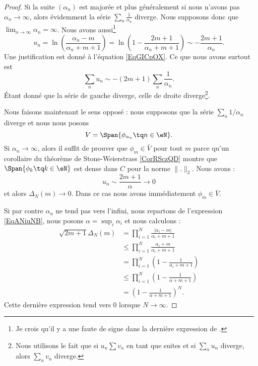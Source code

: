 \begin{proof}
    Si la suite \( (\alpha_n)\) est majorée et plus généralement si nous n'avons pas \( \alpha_n\to \infty\), alors évidemment la série \( \sum_n\frac{1}{ \alpha_n }\) diverge. Nous supposons donc que \( \lim_{n\to \infty} \alpha_n=\infty\). Nous avons aussi\footnote{Je crois qu'il y a une faute de signe dans la dernière expression de \cite{oYGash}.}
    \begin{equation}
        u_n=\ln\left( \frac{ \alpha_n-m }{ \alpha_n+m+1 } \right)=\ln\left( 1-\frac{ 2m+1 }{ \alpha_n+m+1 } \right)\sim-\frac{ 2m+1 }{ \alpha_n }.
    \end{equation}
    Une justification est donné à l'équation \eqref{EqGICpOX}. Ce que nous avons surtout est
    \begin{equation}
        \sum_n u_n\sim -(2m+1)\sum_n\frac{1}{ \alpha_n }.
    \end{equation}
    Étant donné que la série de gauche diverge, celle de droite diverge\footnote{Nous utilisons le fait que si \( u_n\sum v_n\) en tant que suites et si \( \sum_nu_n\) diverge, alors \( \sum_nv_n\) diverge.}.

    Nous faisons maintenant le sens opposé : nous supposons que la série \( \sum_n1/\alpha_n\) diverge et nous nous posons
    \begin{equation}
        V=\Span\{ \phi_{\alpha_n}\tq n\in \eN \}.
    \end{equation}
    Si \( \alpha_n\to \infty\), alors il suffit de prouver que \( \phi_m\in \bar V\) pour tout \( m\) parce qu'un corollaire du théorème de Stone-Weierstrass \ref{CorRSczQD} montre que \( \Span\{ \phi_k\tq k\in \eN \}\) est dense dans \( C\) pour la norme \( \| . \|_2\). Nous avons :
    \begin{equation}
        u_n\sim\frac{ 2m+1 }{ \alpha }\to 0
    \end{equation}
    et alors \( \Delta_N(m)\to 0\). Dans ce cas nous avons immédiatement \( \phi_m\in \bar V\).

    Si par contre \( \alpha_n\) ne tend pas vers l'infini, nous repartons de l'expression \eqref{EqANiuNB}, nous posons \( \alpha=\sup_i\alpha_i\) et nous calculons :
    \begin{subequations}
        \begin{align}
            \sqrt{2m+1}\Delta_N(m)&=\prod_{i=1}^N\frac{ | \alpha_i-m | }{ \alpha_i+m+1 }\\
            &\leq \prod_{i=1}^N\frac{ \alpha_i+m }{ \alpha_i+m+1 }\\
            &=\prod_{i=1}^N\left( 1-\frac{ 1 }{ \alpha_i+m+1 } \right)\\
            &\leq \prod_{i=1}^N\left( 1-\frac{1}{ \alpha+m+1 } \right)\\
            &=\left( 1-\frac{1}{ \alpha+m+1 } \right)^N.
        \end{align}
    \end{subequations}
    Cette dernière expression tend vers \( 0\) lorsque \( N\to \infty\).
\end{proof}
